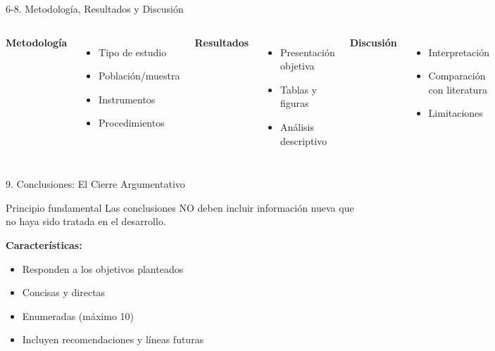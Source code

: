 \documentclass[xcolor=table,aspectratio=169,11pt]{beamer}
\begin{document}
	\begin{frame}{6-8. Metodología, Resultados y Discusión}
		\begin{columns}[T]
			\textbf{Metodología}
			\begin{itemize}
				\item Tipo de estudio
				\item Población/muestra
				\item Instrumentos
				\item Procedimientos
			\end{itemize}
			
			\textbf{Resultados}
			\begin{itemize}
				\item Presentación objetiva
				\item Tablas y figuras
				\item Análisis descriptivo
			\end{itemize}
			
			\textbf{Discusión}
			\begin{itemize}
				\item Interpretación
				\item Comparación con literatura
				\item Limitaciones
			\end{itemize}
		\end{columns}
	\end{frame}
	
	\begin{frame}{9. Conclusiones: El Cierre Argumentativo}
		\begin{alertblock}{Principio fundamental}
			Las conclusiones NO deben incluir información nueva que no haya sido tratada en el desarrollo.
		\end{alertblock}
		
		\textbf{Características:}
		\begin{itemize}
			\item Responden a los objetivos planteados
			\item Concisas y directas
			\item Enumeradas (máximo 10)
			\item Incluyen recomendaciones y líneas futuras
		\end{itemize}
	\end{frame}
	
\end{document}

